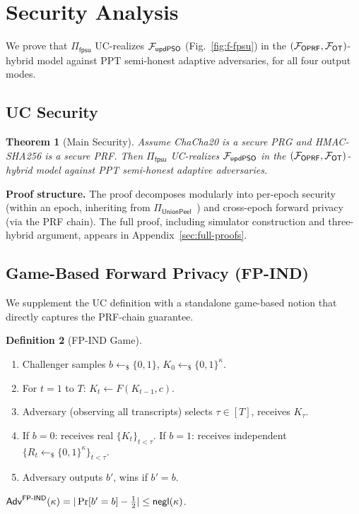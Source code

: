 \documentclass[letterpaper,twocolumn,10pt]{article}
\newtheorem{theorem}{Theorem}
\theoremstyle{definition}
\newtheorem{definition}[theorem]{Definition}
\newcommand{\sample}{\leftarrow_{\$}}\newcommand{\concat}{\|}
\begin{document}
\section{Security Analysis}
\label{sec:security}

We prove that $\Pi_{\mathsf{fpsu}}$ UC-realizes $\mathcal{F}_{\mathsf{updPSO}}$
(Fig.~\ref{fig:f-fpsu}) in the $(\mathcal{F}_{\mathsf{OPRF}}, \mathcal{F}_{\mathsf{OT}})$-hybrid
model against PPT semi-honest adaptive adversaries, for all four output modes.

\subsection{UC Security}

\begin{theorem}[Main Security]\label{thm:main}
Assume ChaCha20 is a secure PRG and HMAC-SHA256 is a secure PRF. Then
$\Pi_{\mathsf{fpsu}}$ UC-realizes $\mathcal{F}_{\mathsf{updPSO}}$ in the
$(\mathcal{F}_{\mathsf{OPRF}}, \mathcal{F}_{\mathsf{OT}})$-hybrid model against PPT semi-honest
adaptive adversaries.
\end{theorem}

\textbf{Proof structure.} The proof decomposes modularly into per-epoch security
(within an epoch, inheriting from $\Pi_{\mathsf{UnionPeel}}$~\cite{PT26}) and
cross-epoch forward privacy (via the PRF chain). The full proof, including
simulator construction and three-hybrid argument, appears in
Appendix~\ref{sec:full-proofs}.

\subsection{Game-Based Forward Privacy (FP-IND)}

We supplement the UC definition with a standalone game-based notion that
directly captures the PRF-chain guarantee.

\begin{definition}[FP-IND Game]\label{def:fp-ind}
\begin{enumerate}
\item Challenger samples $b \sample \{0,1\}$, $K_0 \sample \{0,1\}^\kappa$.
\item For $t = 1$ to $T$: $K_t \leftarrow F(K_{t-1}, c)$.
\item Adversary (observing all transcripts) selects $\tau \in [T]$, receives
$K_\tau$.
\item If $b = 0$: receives real $\{K_t\}_{t < \tau}$. If $b = 1$: receives
independent $\{R_t \sample \{0,1\}^\kappa\}_{t < \tau}$.
\item Adversary outputs $b'$, wins if $b' = b$.
\end{enumerate}
$\mathsf{Adv}^{\mathsf{FP\text{-}IND}}(\kappa) = |\Pr[b' = b] - \tfrac{1}{2}|
\leq \mathsf{negl}(\kappa)$.
\end{definition}
\end{document}
